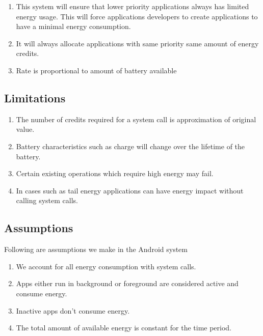 \begin{enumerate}


\item  This system will ensure that lower priority applications always has limited energy usage. This will force applications developers to create applications to have a minimal energy consumption. 

\item  It will always allocate applications with same priority same amount of energy credits.

\item  Rate is proportional to amount of battery available 

\end{enumerate}

\subsection{Limitations}

\begin{enumerate}

\item  The number of credits required for a system call is approximation of original value.
\item  Battery characteristics such as charge will change over the lifetime of the battery. 
\item  Certain existing operations which require high energy may fail.
\item  In cases such as tail energy applications can have energy impact without calling system calls.

\end{enumerate}

\subsection{Assumptions}

Following are assumptions we make in the Android system
\begin{enumerate}

\item  We account for all energy consumption with system calls.
\item  Apps either run in background or foreground are considered active and consume energy.
\item  Inactive apps don't consume energy.
\item  The total amount of available energy is constant for the time period.

\end{enumerate}




















